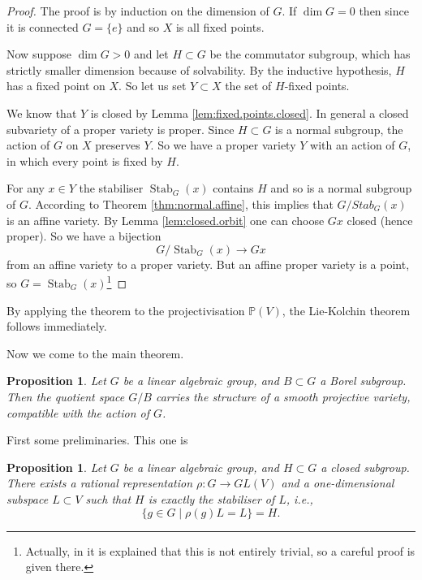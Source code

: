 \documentclass[12pt]{article}
\theoremstyle{plain}
\newtheorem{prop}[thm]{Proposition}
\theoremstyle{definition}
\numberwithin{equation}{section}
\DeclareMathOperator{\Stab}{Stab}
\newcommand{\C}{\mathbb{C}}
\newcommand{\bbP}{\mathbb{P}}
\begin{document}
\begin{proof}
The proof is by induction on the dimension of $G$. If $\dim G = 0$ then since it is connected $G = \{e\}$ and so $X$ is all fixed points.

Now suppose $\dim G > 0$ and let $H \subset G$ be the commutator subgroup, which has strictly smaller dimension because of solvability. By the inductive hypothesis, $H$ has a fixed point on $X$. So let us set $Y \subset X$ the set of $H$-fixed points.

We know that $Y$ is closed by Lemma \ref{lem:fixed.points.closed}. In general a closed subvariety of a proper variety is proper. Since $H \subset G$ is a normal subgroup, the action of $G$ on $X$ preserves $Y$. So we have a proper variety $Y$ with an action of $G$, in which every point is fixed by $H$.

For any $x \in Y$ the stabiliser $\Stab_G(x)$ contains $H$ and so is a normal subgroup of $G$. According to Theorem \ref{thm:normal.affine}, this implies that $G / Stab_G(x)$ is an affine variety. By Lemma \ref{lem:closed.orbit} one can choose $G x$ closed (hence proper). So we have a bijection
\[
G / \Stab_G(x) \rightarrow G x
\]
from an affine variety to a proper variety. But an affine proper variety is a point, so $G = \Stab_G(x)$\footnote{Actually, in \cite{Humphreys.alg.grp} it is explained that this is not entirely trivial, so a careful proof is given there.}
\end{proof}
By applying the theorem to the projectivisation $\bbP(V)$, the Lie-Kolchin theorem follows immediately.




Now we come to the main theorem.
\begin{prop}\label{thm:flag.is.projective}
Let $G$ be a linear algebraic group, and $B \subset G$ a Borel subgroup. Then the quotient space $G / B$ carries the structure of a smooth projective variety, compatible with the action of $G$.
\end{prop}

First some preliminaries. This one is {\cite[11.2]{Humphreys.alg.grp}}
\begin{prop}\label{prop:exact.stabiliser}
Let $G$ be a linear algebraic group, and $H \subset G$ a closed subgroup. There exists a rational representation $\rho : G \rightarrow GL(V)$ and a one-dimensional subspace $L \subset V$ such that $H$ is exactly the stabiliser of $L$, i.e.,
\[
\{g \in G \mid \rho(g) L = L\} = H.
\]
\end{prop}
\end{document}
